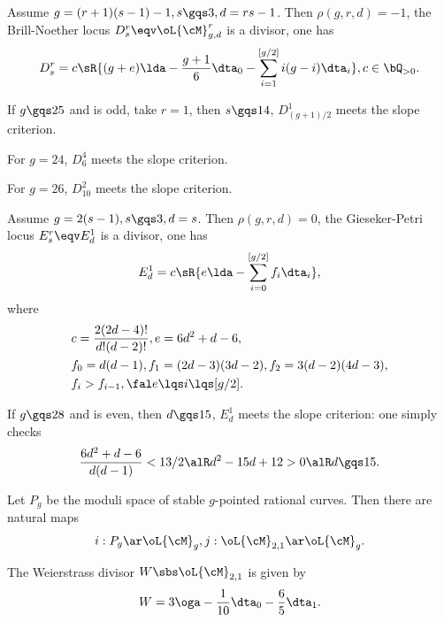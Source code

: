 \documentclass[a4paper, twoside]{article}
\begin{document}

\begin{thm}
	Assume $g=(r+1)(s-1)-1, s\gqs3, d=rs-1$. Then $\rho(g,r,d)=-1$, the Brill-Noether locus $D_{s}^{r}\eqv\oL{\cM}_{g,d}^{r}$ is a divisor, one has
	\[
		D_{s}^{r}=c\sR{(g+e)\lda-\frac{g+1}{6}\dta_{0}-\sum_{i=1}^{[g/2]}i(g-i)\dta_{i}}, c\in\bQ_{>0}.
	\]
\end{thm}

\begin{cor}
	If $g\gqs25$ and is odd, take $r=1$, then $s\gqs14$, $D_{(g+1)/2}^{1}$ meets the slope criterion.

	For $g=24$, $D_{6}^{4}$ meets the slope criterion.

	For $g=26$, $D_{10}^{2}$ meets the slope criterion.
\end{cor}


\begin{thm}
	Assume $g=2(s-1), s\gqs3, d=s$. Then $\rho(g,r,d)=0$, the Gieseker-Petri locus $E_{s}^{r}\eqv E_{d}^{1}$ is a divisor, one has
	\[
		E_{d}^{1}=c\sR{e\lda-\sum_{i=0}^{[g/2]}f_{i}\dta_{i}},
	\]
	where
	\begin{align*}
	  &c=\frac{2(2d-4)!}{d!(d-2)!}, e=6d^{2}+d-6,\\
	  &f_{0}=d(d-1), f_{1}=(2d-3)(3d-2), f_{2}=3(d-2)(4d-3),\\
	  &f_{i}>f_{i-1}, \fal e\lqs i\lqs [g/2].
	\end{align*}
\end{thm}

\begin{cor}
	If $g\gqs28$ and is even, then $d\gqs15$, $E_{d}^{1}$ meets the slope criterion: one simply checks
	\[
		\frac{6d^{2}+d-6}{d(d-1)}<13/2\alR d^{2}-15d+12>0\alR d\gqs15.
	\]
\end{cor}

\begin{stp}
	Let $P_{g}$ be the moduli space of stable $g$-pointed rational curves. Then there are natural maps
	\[
		i:P_{g}\ar\oL{\cM}_{g}, j:\oL{\cM}_{2,1}\ar\oL{\cM}_{g}.
	\]
\end{stp}


\begin{thm}[Theorem~2.2]
	The Weierstrass divisor $W\sbs\oL{\cM}_{2,1}$ is given by
	\[
		W=3\oga-\frac{1}{10}\dta_{0}-\frac{6}{5}\dta_{1}.
	\]
\end{thm}
\end{document}
